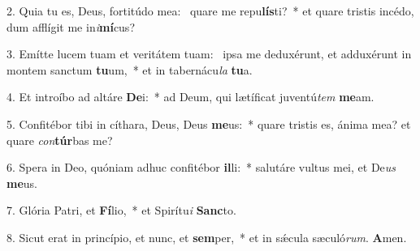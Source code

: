 2. Quia tu es, Deus, fortitúdo mea: \dag\  quare me repu\textbf{lís}ti?~*  et quare tristis incédo, dum afflígit me in\textit{i}\textbf{mí}cus?\

3. Emítte lucem tuam et veritátem tuam: \dag\  ipsa me deduxérunt, et adduxérunt in montem sanctum \textbf{tu}um,~*  et in tabernácu\textit{la} \textbf{tu}a.\

4. Et introíbo ad altáre \textbf{De}i:~*  ad Deum, qui lætíficat juventú\textit{tem} \textbf{me}am.\

5. Confitébor tibi in cíthara, Deus, Deus \textbf{me}us:~*  quare tristis es, ánima mea? et quare \textit{con}\textbf{túr}bas me?\

6. Spera in Deo, quóniam adhuc confitébor \textbf{il}li:~*  salutáre vultus mei, et De\textit{us} \textbf{me}us.\

7. Glória Patri, et \textbf{Fí}lio,~*  et Spirítu\textit{i} \textbf{Sanc}to.\

8. Sicut erat in princípio, et nunc, et \textbf{sem}per,~*  et in sǽcula sæculó\textit{rum}. \textbf{A}men.\

